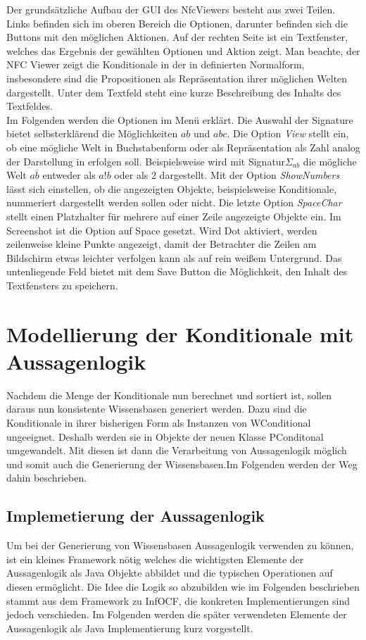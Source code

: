 \documentclass[12pt,a4paper]{article}
\begin{document}
Der grundsätzliche Aufbau der GUI des NfcViewers besteht aus zwei Teilen. Links befinden sich im oberen Bereich die Optionen, darunter befinden sich die Buttons mit den möglichen Aktionen. Auf der rechten Seite ist ein Textfenster, welches das Ergebnis der gewählten Optionen und Aktion zeigt. Man beachte, der NFC Viewer zeigt die Konditionale in der in \cite{beierle19} definierten Normalform, insbesondere sind die Propositionen als Repräsentation ihrer möglichen Welten dargestellt. Unter dem Textfeld steht eine kurze Beschreibung des Inhalts des Textfeldes. \\
Im Folgenden werden die Optionen im Menü erklärt. Die Auswahl der Signature bietet selbsterklärend die Möglichkeiten $ab$ und $abc$. Die Option \textit{View} stellt ein, ob eine mögliche Welt in Buchstabenform oder als Repräsentation als Zahl analog der Darstellung in \cite{beierle19} erfolgen soll. Beispielsweise wird mit Signatur$\Sigma_{ab}$ die mögliche Welt $a \overline{b}$ entweder als $a!b$ oder als 2 dargestellt. Mit der Option \textit{ShowNumbers} lässt sich einstellen, ob die angezeigten Objekte, beispielsweise Konditionale, nummeriert dargestellt werden sollen oder nicht. Die letzte Option \textit{SpaceChar} stellt einen Platzhalter für mehrere auf einer Zeile angezeigte Objekte ein. Im Screenshot ist die Option auf Space gesetzt. Wird Dot aktiviert, werden zeilenweise kleine Punkte angezeigt, damit der Betrachter die Zeilen am Bildschirm etwas leichter verfolgen kann als auf rein weißem Untergrund. Das untenliegende Feld bietet mit dem Save Button die Möglichkeit, den Inhalt des Textfensters zu speichern.



\section{Modellierung der Konditionale mit Aussagenlogik}
Nachdem die Menge der Konditionale nun berechnet und sortiert ist, sollen daraus nun konsistente Wissensbasen generiert werden. Dazu sind die Konditionale in ihrer bisherigen Form als Instanzen von WConditional ungeeignet. Deshalb werden sie in Objekte der neuen Klasse PConditonal umgewandelt. Mit diesen ist dann die Verarbeitung von Aussagenlogik möglich und somit auch die Generierung der Wissensbasen.Im Folgenden werden der Weg dahin beschrieben.




\subsection{Implemetierung der Aussagenlogik}
\label{sec:logic}
Um bei der Generierung von Wissensbasen Aussagenlogik verwenden zu können, ist ein kleines Framework nötig welches die wichtigsten Elemente der Aussagenlogik als Java Objekte abbildet und die typischen Operationen auf diesen ermöglicht. Die Idee die Logik so abzubilden wie im Folgenden beschrieben stammt aus dem Framework zu InfOCF, die konkreten Implementierungen sind jedoch verschieden. Im Folgenden werden die später verwendeten Elemente der Aussagenlogik als Java Implementierung kurz vorgestellt. \\
\end{document}

